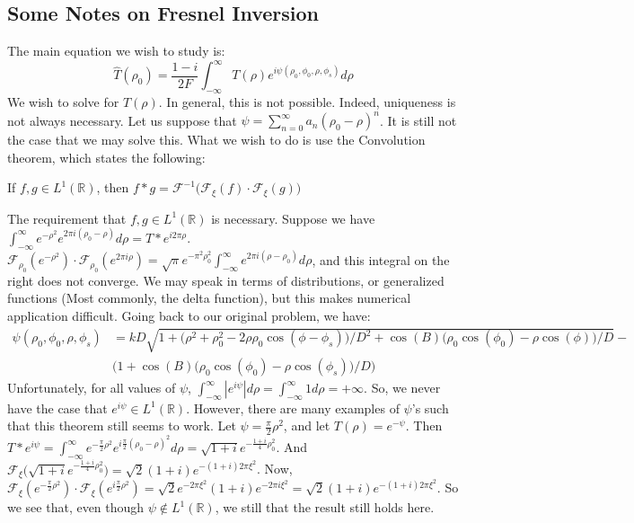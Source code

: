 \documentclass[crop=false,class=book,oneside]{standalone}
\begin{document}
        \subsection{Some Notes on Fresnel Inversion}
            The main equation we wish to study is:
            \begin{equation*}
            \hat{T}(\rho_0) = \frac{1-i}{2F}\int_{-\infty}^{\infty} T(\rho)e^{i\psi(\rho_0,\phi_0,\rho,\phi_s)}d\rho
            \end{equation*}
            We wish to solve for $T(\rho)$. In general, this is not possible. Indeed, uniqueness is not always necessary. Let us suppose that $\psi = \sum_{n=0}^{\infty}a_n(\rho_0 - \rho)^n$. It is still not the case that we may solve this. What we wish to do is use the Convolution theorem, which states the following:
            \begin{theorem}
            If $f,g\in L^{1}(\mathbb{R})$, then $f*g = \mathcal{F}^{-1}\big(\mathcal{F}_{\xi}(f)\cdot \mathcal{F}_{\xi}(g)\big)$
            \end{theorem}
            The requirement that $f,g\in L^{1}(\mathbb{R})$ is necessary. Suppose we have $\int_{-\infty}^{\infty} e^{-\rho^2}e^{2\pi i(\rho_0 - \rho)}d\rho = T*e^{i2\pi \rho}$. $\mathcal{F}_{\rho_0}(e^{-\rho^2})\cdot \mathcal{F}_{\rho_0}(e^{2\pi i \rho}) = \sqrt{\pi}e^{-\pi^2 \rho_0^2}\int_{-\infty}^{\infty}e^{2\pi i(\rho-\rho_0)}d\rho$, and this integral on the right does not converge. We may speak in terms of distributions, or generalized functions (Most commonly, the delta function), but this makes numerical application difficult. Going back to our original problem, we have:
            \begin{align*}
            \nonumber \psi(\rho_0,\phi_0,\rho,\phi_s) &= kD\sqrt{1+\big(\rho^2+\rho_0^2 - 2\rho \rho_0 \cos(\phi - \phi_s)\big)/D^2 + \cos(B)\big(\rho_0\cos(\phi_0) - \rho\cos(\phi)\big)/D} - \\ &\bigg(1+\cos(B)(\rho_0\cos(\phi_0) - \rho\cos(\phi_s)\big)/D\bigg)
            \end{align*}
            Unfortunately, for all values of $\psi$, $\int_{-\infty}^{\infty} |e^{i\psi}|d\rho = \int_{-\infty}^{\infty} 1d\rho = +\infty$. So, we never have the case that $e^{i\psi} \in L^{1}(\mathbb{R})$. However, there are many examples of $\psi$'s such that this theorem still seems to work. Let $\psi = \frac{\pi}{2}\rho^2$, and let $T(\rho) = e^{-\psi}$. Then $T*e^{i\psi} = \int_{-\infty}^{\infty} e^{-\frac{\pi}{2}\rho^2}e^{i\frac{\pi}{2}(\rho_0-\rho)^2}d\rho = \sqrt{1+i}e^{-\frac{1+i}{4}\rho_0^2}$. And $\mathcal{F}_{\xi}\big(\sqrt{1+i}e^{-\frac{1+i}{4}\rho_0^2}\big) = \sqrt{2}(1+i)e^{-(1+i)2\pi \xi^2}$. Now, $\mathcal{F}_{\xi}(e^{-\frac{\pi}{2}\rho^2})\cdot \mathcal{F}_{\xi}(e^{i\frac{\pi}{2}\rho^2}) = \sqrt{2}e^{-2\pi \xi^2}(1+i)e^{-2\pi i \xi^2} = \sqrt{2}(1+i)e^{-(1+i)2\pi \xi^2}$. So we see that, even though $\psi \notin L^{1}(\mathbb{R})$, we still that the result still holds here. 
\end{document}
